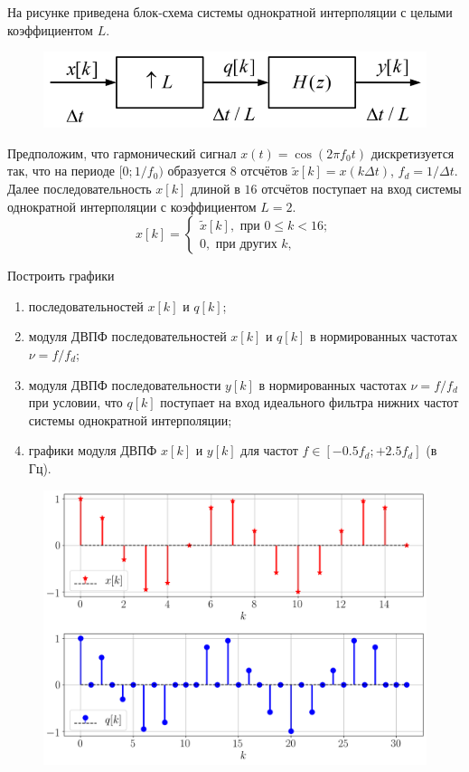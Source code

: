 \newpage
\section{}
На рисунке приведена блок-схема системы однократной интерполяции с целыми коэффициентом $L$.

\begin{figure}[!h]
	\centering
	\includegraphics[width=0.8\columnwidth]{pics/spring/8/820.png}
	\label{fig:8-2-0}
\end{figure}

Предположим, что гармонический сигнал $x(t) = \cos (2\pi f_0 t)$ дискретизуется так, что на периоде $[0; 1/f_0)$ образуется $8$ отсчётов $\tilde{x}[k] = x(k\Delta t)$, $f_d=1/\Delta t$.
Далее последовательность $x[k]$ длиной в $16$ отсчётов поступает на вход системы однократной интерполяции с коэффициентом $L=2$.
\begin{equation*}
x[k] = \begin{cases}
\tilde{x}[k], \text{ при } 0 \leq k < 16;\\
0, \text{ при других } k,
\end{cases}
\end{equation*}

Построить графики
\begin{enumerate}[label=(\alph*)]
	\item последовательностей $x[k]$ и $q[k]$;
	\item модуля ДВПФ последовательностей $x[k]$ и $q[k]$
	в нормированных	частотах $\nu = f/f_d$;
	\item модуля ДВПФ последовательности $y[k]$	в нормированных частотах $\nu = f/f_d$ при условии, что $q[k]$ поступает на вход идеального фильтра	нижних частот системы однократной интерполяции;
	\item графики модуля ДВПФ $x[k]$ и $y[k]$ для частот $f \in [-0.5f_d; +2.5f_d]$ (в Гц).
\end{enumerate}

\begin{figure}[!h]
	\centering
	\includegraphics[width=0.7\columnwidth]{pics/spring/8/8-2-1.png}
	\label{fig:8-2-1}
\end{figure}

